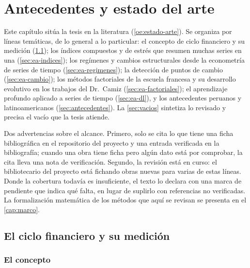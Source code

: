 \chapter{Antecedentes y estado del arte}
\label{cap:estado-arte}

Este capítulo sitúa la tesis en la literatura (\cref{oe:estado-arte}). Se organiza por líneas
temáticas, de lo general a lo particular: el concepto de ciclo financiero y su medición
(\cref{sec:ea-ciclo}); los índices compuestos y de estrés que resumen muchas series en una
(\cref{sec:ea-indices}); los regímenes y cambios estructurales desde la econometría de series de
tiempo (\cref{sec:ea-regimenes}); la detección de puntos de cambio (\cref{sec:ea-cambio}); los
métodos factoriales de la escuela francesa y su desarrollo evolutivo en los trabajos del
Dr.~Camiz (\cref{sec:ea-factoriales}); el aprendizaje profundo aplicado a series de tiempo
(\cref{sec:ea-dl}), y los antecedentes peruanos y latinoamericanos (\cref{sec:antecedentes}). La
\cref{sec:vacios} sintetiza lo revisado y precisa el vacío que la tesis atiende.

Dos advertencias sobre el alcance. Primero, solo se cita lo que tiene una ficha bibliográfica en
el repositorio del proyecto y una entrada verificada en la bibliografía; cuando una obra tiene
ficha pero algún dato está por comprobar, la cita lleva una nota de verificación. Segundo, la
revisión está en curso: el bibliotecario del proyecto está fichando obras nuevas para varias de
estas líneas. Donde la cobertura todavía es insuficiente, el texto lo declara con una marca de
pendiente que indica qué falta, en lugar de suplirlo con referencias no verificadas. La
formalización matemática de los métodos que aquí se revisan se presenta en el
\cref{cap:marco}.

\section{El ciclo financiero y su medición}
\label{sec:ea-ciclo}

\subsection{El concepto}

